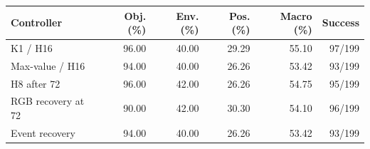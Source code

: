 \begin{tabular}{lrrrrr}
\toprule
Controller & Obj. (\%) & Env. (\%) & Pos. (\%) & Macro (\%) & Success \\
\midrule
K1 / H16 & 96.00 & 40.00 & 29.29 & 55.10 & 97/199 \\
Max-value / H16 & 94.00 & 40.00 & 26.26 & 53.42 & 93/199 \\
H8 after 72 & 96.00 & 42.00 & 26.26 & 54.75 & 95/199 \\
RGB recovery at 72 & 90.00 & 42.00 & 30.30 & 54.10 & 96/199 \\
Event recovery & 94.00 & 40.00 & 26.26 & 53.42 & 93/199 \\
\bottomrule
\end{tabular}
